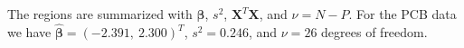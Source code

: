 
The regions are summarized with \(\widehat{\boldsymbol{\beta}}\), \(s^{2}\),
\(\boldsymbol{X}^{T}\boldsymbol{X}\), and \(\nu = N - P\). For the PCB data we
have \(\widehat{\boldsymbol{\beta}} = ( - 2.391,\ 2.300)^{T}\),
\(s^{2} = 0.246\), and \(\nu = 26\) degrees of freedom.

